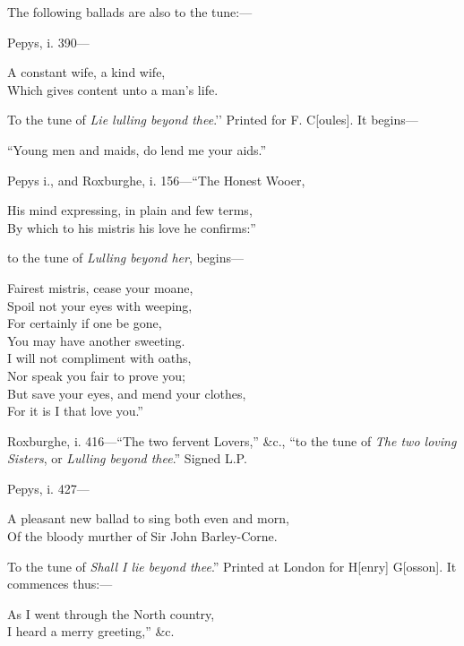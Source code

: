 The following ballads are also to the tune:—

Pepys, i. 390—
\settowidth{\versewidth}{Which gives content unto a man’s life.}
\begin{scverse}A constant wife, a kind wife,\\
Which gives content unto a man’s life.
\end{scverse}
To the tune of \textit{Lie lulling beyond thee}.'’ Printed for F. C[oules]. It begins—
\settowidth{\versewidth}{“Young men and maids, do lend me your aids.”}
\begin{scverse}“Young men and maids, do lend me your aids.”
\end{scverse}

Pepys i., and Roxburghe, i. 156—“The Honest Wooer,
\begin{scverse}His mind expressing, in plain and few terms,\\
By which to his mistris his love he confirms:”
\end{scverse}
to the tune of \textit{Lulling beyond her}, begins—
\begin{scverse}\begin{altverse}
Fairest mistris, cease your moane,\\
Spoil not your eyes with weeping,\\
For certainly if one be gone,\\
You may have another sweeting.\\
I will not compliment with oaths,\\
Nor speak you fair to prove you;\\
But save your eyes, and mend your clothes,\\
For it is I that love you.”
\end{altverse}
\end{scverse}

Roxburghe, i. 416—“The two fervent Lovers,” \&c., “to the tune of \textit{The two
loving Sisters}, or \textit{Lulling beyond thee}.” Signed L.P.

Pepys, i. 427—
\begin{scverse}A pleasant new ballad to sing both even and morn,\\
Of the bloody murther of Sir John Barley-Corne.
\end{scverse}
To the tune of \textit{Shall I lie beyond thee}.” Printed at London for H[enry] G[osson].
It commences thus:—
\begin{scverse}As I went through the North country,\\
I heard a merry greeting,” \&c.
\end{scverse}

